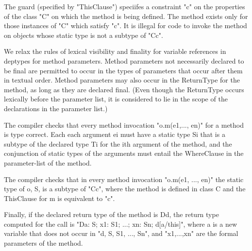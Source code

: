 The guard (specified by \xcd"ThisClause") speciifes a constraint \xcd"c" on the
properties of the class \xcd"C" on which the method is being defined. The
method exists only for those instances of \xcd"C" which satisfy \xcd"c".  It is
illegal for code to invoke the method on objects whose static type is
not a subtype of \xcd"C{c}".

We relax the rules of lexical visibility and finality for variable
references in deptypes for method parameters.  Method
parameters not necessarily declared to be final are permitted to occur
in the types of parameters that occur after them in textual
order. Method parameters may also occur in the ReturnType for the
method, as long as they are declared final. (Even though the ReturnType
occurs lexically before the parameter list, it is considered to lie in
the scope of the declarations in the parameter list.)

\begin{staticrule*}
    The compiler checks that every method invocation \xcd"o.m(e1,..., en)"
    for a method is type correct. Each each argument ei must have a
    static type Si that is a subtype of the declared type Ti for the ith
    argument of the method, and the conjunction of static types
    of the arguments must entail the WhereClause in the parameter-list
    of the method.

    The compiler checks that in every method invocation \xcd"o.m(e1, ..., en)"
    the static type of o, S, is a subtype of \xcd"C{c}", where the method
    is defined in class C and the ThisClause for m is equivalent to
    \xcd"c".

    Finally, if the declared return type of the method is D{d}, the
    return type computed for the call is
    \xcd"D{a: S; x1: S1; ...; xn: Sn; d[a/this]}", where a is a new
    variable that does not occur in
    \xcd"d, S, S1, ..., Sn", and \xcd"x1,...,xn" are the formal
    parameters of the method.
\end{staticrule*}

